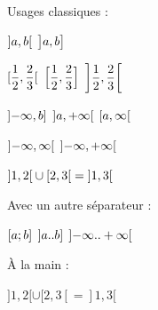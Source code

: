 \documentclass[varwidth, border = 3pt]{standalone}
\begin{document}
Usages classiques :

$\intervalO{a, b}$
\quad
$\intervalOC[\big]{a, b}$

$\intervalCO{\dfrac{1}{2}, \dfrac{2}{3}}$
\quad
$\intervalC[\Big]{\dfrac{1}{2}, \dfrac{2}{3}}$
\quad
$\intervalO*{\dfrac{1}{2}, \dfrac{2}{3}}$

$\intervalOC{-\infty, b}$
\quad
$\intervalO{a, +\infty}$
\quad
$\intervalCO{a, \infty}$

$\intervalO{-\infty, \infty}$
\quad
$\intervalO{-\infty, +\infty}$

$\intervalO{1, 2} \cup \intervalCO{2, 3} = \intervalO{1, 3}$


\medskip


Avec un autre séparateur :

$\intervalC{a ; b}$
\quad
$\intervalOC{a .. b}$
\quad
$\intervalO{-\infty .. +\infty}$


\medskip


À la main :

$]1, 2[ \cup [2, 3[ = ]1, 3[$
\end{document}
